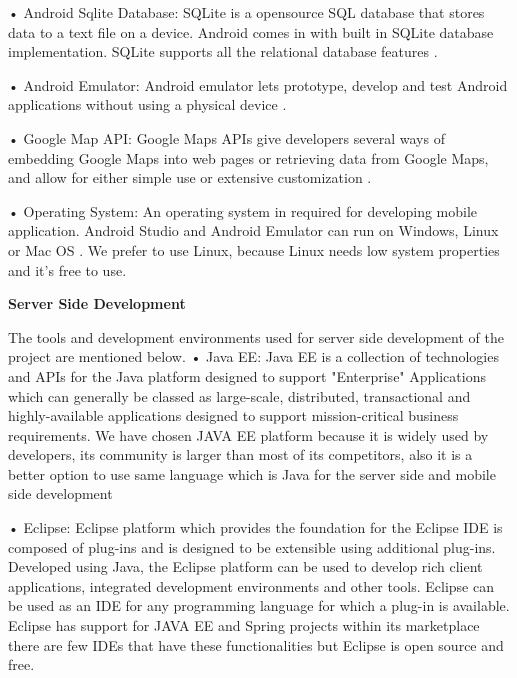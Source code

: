 • Android Sqlite Database: SQLite is a opensource SQL database that stores data to a text file on a device. Android comes in with built in SQLite database implementation. SQLite supports all the relational database features \cite{androidStudioSqlite}.
\newline

• Android Emulator: Android emulator lets prototype, develop and test Android applications without using a physical device \cite{androidEmulator}.
\newline

• Google Map API: Google Maps APIs give developers several ways of embedding Google Maps into web pages or retrieving data from Google Maps, and allow for either simple use or extensive customization \cite{googleMapAPI}.
\newline

• Operating System: An operating system in required for developing mobile application. Android Studio and Android Emulator can run on Windows, Linux or Mac OS \cite{mac}. We prefer to use Linux, because Linux needs low system properties and it's free to use. 


\textbf{Server Side Development}

The tools and development environments used for server side development of the
project are mentioned below.
\newline
• Java EE: Java EE is a collection of technologies and APIs for the Java platform designed to support "Enterprise" Applications which can generally be classed as large-scale, distributed, transactional and highly-available applications designed to support mission-critical business requirements. \cite{javaEETanim}
We have chosen JAVA EE platform because it is widely used by developers, its community is larger than most of its competitors, also it is a better option to use same language which is Java for the server side and mobile side development


• Eclipse: Eclipse platform which provides the foundation for the Eclipse IDE is composed of plug-ins and is designed to be extensible using additional plug-ins. Developed using Java, the Eclipse platform can be used to develop rich client applications, integrated development environments and other tools. \cite{eclipseTanim}
Eclipse can be used as an IDE for any programming language for which a plug-in is available. Eclipse has support for JAVA EE and Spring projects within its marketplace there are few IDEs that have these functionalities but Eclipse is open source and free.


